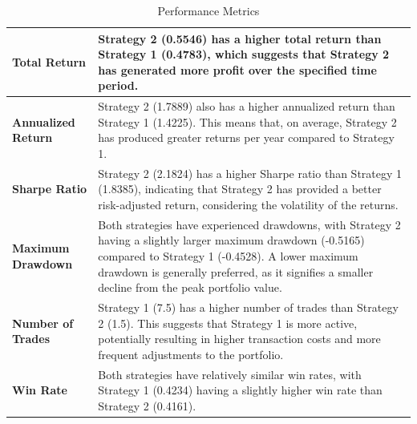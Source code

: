 \documentclass[12pt,a4paper]{article}
\begin{document}
    \begin{table}[h!]
    \centering
    \caption{Performance Metrics}
    \begin{tabular}{|l|p{9cm}|}
        \hline
      \textbf{Total Return}&Strategy 2 (0.5546) has a higher total return than Strategy 1 (0.4783), which suggests that Strategy 2 has generated more profit over the specified time period. \\ %
       \hline %
        \textbf{Annualized Return}&Strategy 2 (1.7889) also has a higher annualized return than Strategy 1 (1.4225). This means that, on average, Strategy 2 has produced greater returns per year compared to Strategy 1. \\ %
       \hline %
        \textbf{Sharpe Ratio}&Strategy 2 (2.1824) has a higher Sharpe ratio than Strategy 1 (1.8385), indicating that Strategy 2 has provided a better risk-adjusted return, considering the volatility of the returns. \\ %
       \hline %
        \textbf{Maximum Drawdown}&Both strategies have experienced drawdowns, with Strategy 2 having a slightly larger maximum drawdown (-0.5165) compared to Strategy 1 (-0.4528). A lower maximum drawdown is generally preferred, as it signifies a smaller decline from the peak portfolio value. \\ %
       \hline %
        \textbf{Number of Trades}&Strategy 1 (7.5) has a higher number of trades than Strategy 2 (1.5). This suggests that Strategy 1 is more active, potentially resulting in higher transaction costs and more frequent adjustments to the portfolio. \\ %
       \hline %
        \textbf{Win Rate}&Both strategies have relatively similar win rates, with Strategy 1 (0.4234) having a slightly higher win rate than Strategy 2 (0.4161). \\ %
       \hline %
    \end{tabular}
\end{table}
\clearpage
\end{document}
